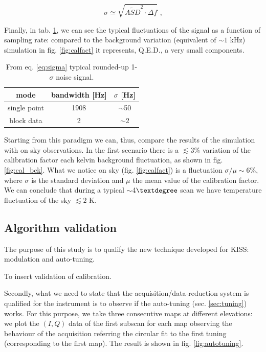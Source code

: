 \begin{equation}
\sigma\simeq \sqrt{ \tilde{ASD}^2 \cdot \Delta f } \text{ ,}
\end{equation}

\noindent Finally, in tab. \ref{tab:sigma_sig}, we can see the typical fluctuations of the signal as a function of sampling rate: compared to the background variation (equivalent of $\sim 1$ kHz) simulation in fig. \ref{fig:calfact} it represents, Q.E.D., a very small components.

\begin{table}[htf]
	\footnotesize
	\centering
	\caption{From eq. \ref{eq:sigma} typical rounded-up 1-$\sigma$ noise signal.}
	\begin{tabular}{ccc}
		\toprule
		\textbf{mode} & \textbf{bandwidth [Hz]} & \textbf{$\sigma$ [Hz]} \\
		\toprule
		single point & 1908 & $\sim$50 \\ 
		\midrule 
		block data & 2 & $\sim$2 \\ 
		\bottomrule
	\end{tabular}
	\label{tab:sigma_sig}
\end{table}

Starting from this paradigm we can, thus, compare the results of the simulation with on sky observations. In the first scenario there is a $\lesssim 3\%$ variation of the calibration factor each kelvin background fluctuation, as shown in fig. \ref{fig:cal_bck}. What we notice on sky (fig. \ref{fig:calfact}) is a fluctuation $\sigma/\mu\sim6\%$, where $\sigma$ is the standard deviation and $\mu$ the mean value of the calibration factor. We can conclude that during a typical $\sim$4$\textdegree$ scan we have temperature fluctuation of the sky $\lesssim 2$ K.


\subsection{Algorithm validation}
The purpose of this study is to qualify the new technique developed for KISS: modulation and auto-tuning.

\color{red}
To insert validation of calibration.
\color{black}

Secondly, what we need to state that the acquisition/data-reduction system is qualified for the instrument is to observe if the auto-tuning (sec. \ref{sec:tuning}) works. For this purpose, we take three consecutive maps at different elevations: we plot the $(I,Q)$ data of the first subscan for each map observing the behaviour of the acquisition referring the circular fit to the first tuning (corresponding to the first map). The result is shown in fig. \ref{fig:autotuning}.

